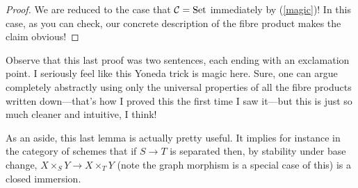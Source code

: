 \begin{proof}
  We are reduced to the case that $\mathcal{C} = \mathrm{Set}$ immediately by
  (\ref{magic})! In this case, as you can check, our concrete
  description of the fibre product makes the claim obvious!
\end{proof}

Observe that this last proof was two sentences, each ending with an
exclamation point. I seriously feel like this Yoneda trick is magic
here. Sure, one can argue completely abstractly using only the
universal properties of all the fibre products written down---that's
how I proved this the first time I saw it---but this is just so much
cleaner and intuitive, I think!

\begin{remark}
  As an aside, this last lemma is actually pretty useful. It implies
  for instance in the category of schemes that if $S \to T$ is
  separated then, by stability under base change, $X \times_S Y \to X
  \times_T Y$ (note the graph morphism is a special case of this) is a
  closed immersion.
\end{remark}






